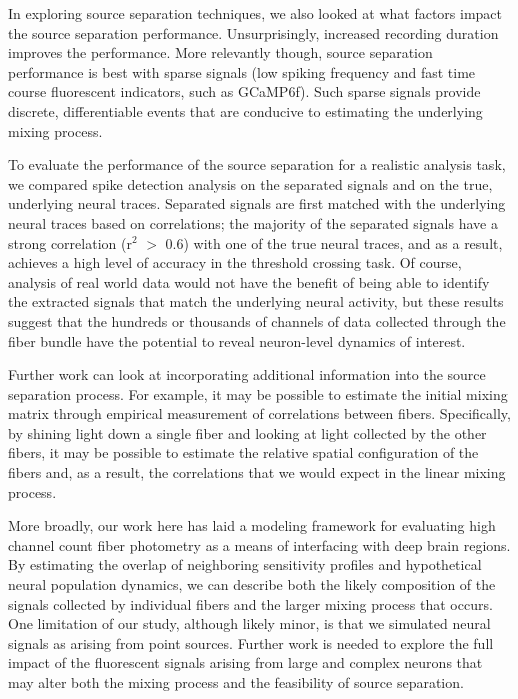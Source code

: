 In exploring source separation techniques, we also looked at what factors impact the source separation performance. Unsurprisingly, increased recording duration improves the performance. More relevantly though, source separation performance is best with sparse signals (low spiking frequency and fast time course fluorescent indicators, such as GCaMP6f). Such sparse signals provide discrete, differentiable events that are conducive to estimating the underlying mixing process.

To evaluate the performance of the source separation for a realistic analysis task, we compared spike detection analysis on the separated signals and on the true, underlying neural traces. Separated signals are first matched with the underlying neural traces based on correlations; the majority of the separated signals have a strong correlation (r$^2$ $>$ 0.6) with one of the true neural traces, and as a result, achieves a high level of accuracy in the threshold crossing task. Of course, analysis of real world data would not have the benefit of being able to identify the extracted signals that match the underlying neural activity, but these results suggest that the hundreds or thousands of channels of data collected through the fiber bundle have the potential to reveal neuron-level dynamics of interest.

Further work can look at incorporating additional information into the source separation process. For example, it may be possible to estimate the initial mixing matrix through empirical measurement of correlations between fibers. Specifically, by shining light down a single fiber and looking at light collected by the other fibers, it may be possible to estimate the relative spatial configuration of the fibers and, as a result, the correlations that we would expect in the linear mixing process.

More broadly, our work here has laid a modeling framework for evaluating high channel count fiber photometry as a means of interfacing with deep brain regions. By estimating the overlap of neighboring sensitivity profiles and hypothetical neural population dynamics, we can describe both the likely composition of the signals collected by individual fibers and the larger mixing process that occurs. One limitation of our study, although likely minor, is that we simulated neural signals as arising from point sources. Further work is needed to explore the full impact of the fluorescent signals arising from large and complex neurons that may alter both the mixing process and the feasibility of source separation.

